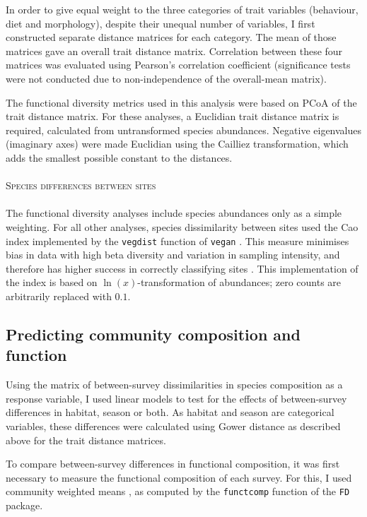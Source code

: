 \documentclass[12pt,a4paper]{book}
\begin{document}
In order to give equal weight to the three categories of trait variables (behaviour, diet and morphology), despite their unequal number of variables, I first constructed separate distance matrices for each category. The mean of those matrices gave an overall trait distance matrix. Correlation between these four matrices was evaluated using Pearson's correlation coefficient (significance tests were not conducted due to non-independence of the overall-mean matrix).

The functional diversity metrics used in this analysis were based on PCoA \citep{Laliberte2010} of the trait distance matrix. For these analyses, a Euclidian trait distance matrix is required, calculated from untransformed species abundances. Negative eigenvalues (imaginary axes) were made Euclidian using the Cailliez transformation, which adds the smallest possible constant to the distances.\\
\\
\textsc{Species differences between sites}\\
\\
The functional diversity analyses include species abundances only as a simple weighting. For all other analyses, species dissimilarity between sites used the Cao index implemented by the \texttt{vegdist} function of \texttt{vegan} \citep{Oksanen2016}. This measure minimises bias in data with high beta diversity and variation in sampling intensity, and therefore has higher success in correctly classifying sites \citep{Cao1997}. This implementation of the index is based on $\ln(x)$-transformation of abundances; zero counts are arbitrarily replaced with $0.1$.

\subsection{Predicting community composition and function}

Using the matrix of between-survey dissimilarities in species composition as a response variable, I used linear models to test for the effects of between-survey differences in habitat, season or both. As habitat and season are categorical variables, these differences were calculated using Gower distance as described above for the trait distance matrices.

To compare between-survey differences in functional composition, it was first necessary to measure the functional composition of each survey. For this, I used community weighted means \citep[CWMs:][]{Lavorel2008}, as computed by the \texttt{functcomp} function of the \texttt{FD} package. 
\end{document}
